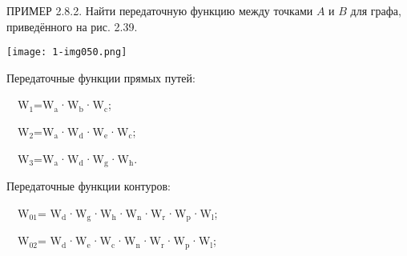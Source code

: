 \documentclass[a4paper]{article}
\newcommand\textsubscript[1]{\ensuremath{{}_{\text{#1}}}}
\begin{document}
\bigskip

{\begin{russian}\sffamily
ПРИМЕР 2.8.2. Найти передаточную функцию между точками  $A$ и  $B$ для графа, приведённого на рис. 2.39.
\end{russian}}

{\centering  \texttt{[image: 1-img050.png]} \par}

\bigskip


\bigskip

{\begin{russian}\sffamily
Передаточные функции прямых путей:
\end{russian}}

{\begin{russian}\sffamily
\ \ W\textsubscript{1}=W\textsubscript{a}·W\textsubscript{b}·W\textsubscript{c};
\end{russian}}

{\begin{russian}\sffamily
\ \ \textenglish{W}\textenglish{\textsubscript{2}}\textenglish{=W}\textenglish{\textsubscript{a}}·\textenglish{W}\textenglish{\textsubscript{d}}·\textenglish{W}\textenglish{\textsubscript{e}}·\textenglish{W}\textenglish{\textsubscript{c}}\textenglish{;}
\end{russian}}

{\begin{russian}\sffamily
\textenglish{\ \ W}\textenglish{\textsubscript{3}}\textenglish{=W}\textenglish{\textsubscript{a}}·\textenglish{W}\textenglish{\textsubscript{d}}·\textenglish{W}\textenglish{\textsubscript{g}}·\textenglish{W}\textenglish{\textsubscript{h}}\textenglish{.}
\end{russian}}


\bigskip

{\begin{russian}\sffamily
Передаточные функции контуров:
\end{russian}}


\bigskip

{\begin{russian}\sffamily
\ \ W\textsubscript{01}=
W\textsubscript{d}·W\textsubscript{g}·W\textsubscript{h}·W\textsubscript{n}·W\textsubscript{r}·W\textsubscript{p}·W\textsubscript{l};
\end{russian}}

{\begin{russian}\sffamily
\ \ \textenglish{W}\textenglish{\textsubscript{02}}\textenglish{=
W}\textenglish{\textsubscript{d}}·\textenglish{W}\textenglish{\textsubscript{e}}·\textenglish{W}\textenglish{\textsubscript{c}}·\textenglish{W}\textenglish{\textsubscript{n}}·\textenglish{W}\textenglish{\textsubscript{r}}·\textenglish{W}\textenglish{\textsubscript{p}}·\textenglish{W}\textenglish{\textsubscript{l}}\textenglish{;}
\end{russian}}
\end{document}
